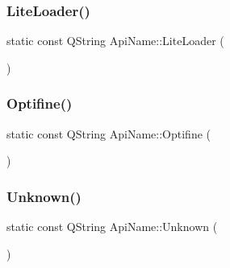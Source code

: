 \subsubsection{\texorpdfstring{Lite\+Loader()}{LiteLoader()}}
{\footnotesize\ttfamily static const Q\+String Api\+Name\+::\+Lite\+Loader (\begin{DoxyParamCaption}\item[{\char`\"{}liteloader\char`\"{}}]{ }\end{DoxyParamCaption})\hspace{0.3cm}{\ttfamily [static]}}

\mbox{\label{namespace_api_name_a5c943268e20cd753b59d91454f0f707e}} 
\subsubsection{\texorpdfstring{Optifine()}{Optifine()}}
{\footnotesize\ttfamily static const Q\+String Api\+Name\+::\+Optifine (\begin{DoxyParamCaption}\item[{\char`\"{}optifine\char`\"{}}]{ }\end{DoxyParamCaption})\hspace{0.3cm}{\ttfamily [static]}}

\mbox{\label{namespace_api_name_a06f12ddbf1519480a0da3b625d28d90b}} 
\subsubsection{\texorpdfstring{Unknown()}{Unknown()}}
{\footnotesize\ttfamily static const Q\+String Api\+Name\+::\+Unknown (\begin{DoxyParamCaption}\item[{\char`\"{}unknown\char`\"{}}]{ }\end{DoxyParamCaption})\hspace{0.3cm}{\ttfamily [static]}}

